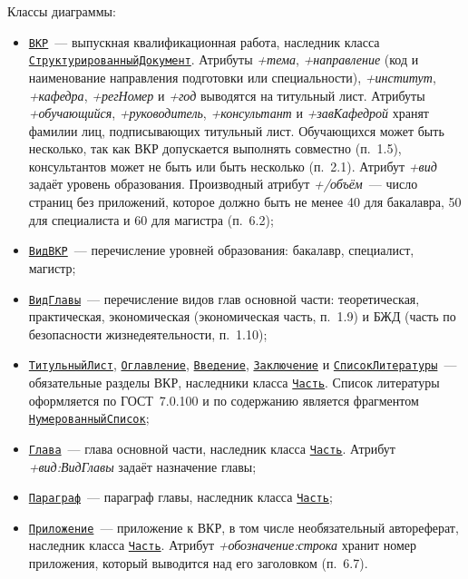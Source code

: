 Классы диаграммы:
\begin{itemize}
	\item \hyperref[fig:UMLvkr]{\Verb|ВКР|}~--- выпускная квалификационная работа, наследник класса \hyperref[fig:UMLdoc]{\Verb|СтруктурированныйДокумент|}. Атрибуты \textit{+тема}, \textit{+направление} (код и наименование направления подготовки или специальности), \textit{+институт}, \textit{+кафедра}, \textit{+регНомер} и \textit{+год} выводятся на титульный лист. Атрибуты \textit{+обучающийся}, \textit{+руководитель}, \textit{+консультант} и \textit{+завКафедрой} хранят фамилии лиц, подписывающих титульный лист. Обучающихся может быть несколько, так как ВКР допускается выполнять совместно (п.~1.5), консультантов может не быть или быть несколько (п.~2.1). Атрибут \textit{+вид} задаёт уровень образования. Производный атрибут \textit{+/объём}~--- число страниц без приложений, которое должно быть не менее 40 для бакалавра, 50 для специалиста и 60 для магистра (п.~6.2);
	\item \hyperref[fig:UMLvkr]{\Verb|ВидВКР|}~--- перечисление уровней образования: бакалавр, специалист, магистр;
	\item \hyperref[fig:UMLvkr]{\Verb|ВидГлавы|}~--- перечисление видов глав основной части: теоретическая, практическая, экономическая (экономическая часть, п.~1.9) и БЖД (часть по безопасности жизнедеятельности, п.~1.10);
	\item \hyperref[fig:UMLvkr]{\Verb|ТитульныйЛист|}, \hyperref[fig:UMLvkr]{\Verb|Оглавление|}, \hyperref[fig:UMLvkr]{\Verb|Введение|}, \hyperref[fig:UMLvkr]{\Verb|Заключение|} и \hyperref[fig:UMLvkr]{\Verb|СписокЛитературы|}~--- обязательные разделы ВКР, наследники класса \hyperref[fig:UMLdoc]{\Verb|Часть|}. Список литературы оформляется по ГОСТ~7.0.100 и по содержанию является фрагментом \hyperref[fig:UMLlist]{\Verb|НумерованныйСписок|};
	\item \hyperref[fig:UMLvkr]{\Verb|Глава|}~--- глава основной части, наследник класса \hyperref[fig:UMLdoc]{\Verb|Часть|}. Атрибут \textit{+вид:ВидГлавы} задаёт назначение главы;
	\item \hyperref[fig:UMLvkr]{\Verb|Параграф|}~--- параграф главы, наследник класса \hyperref[fig:UMLdoc]{\Verb|Часть|};
	\item \hyperref[fig:UMLvkr]{\Verb|Приложение|}~--- приложение к ВКР, в том числе необязательный автореферат, наследник класса \hyperref[fig:UMLdoc]{\Verb|Часть|}. Атрибут \textit{+обозначение:строка} хранит номер приложения, который выводится над его заголовком (п.~6.7).
\end{itemize}

